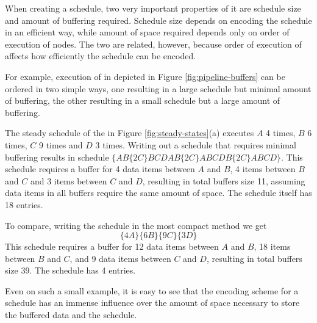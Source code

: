 \begin{comment}
\begin{figure}
\begin{center}

\psfig{figure=pipeline-buffers.eps,width=0.6in} \caption[4 {\filter}
{\pipeline}]{Sample 4 {\filter} {\pipeline}.  This {\pipeline} is
the same as one in Figure \ref{fig:steady-state} (a), except that
its children do not peek extra data} \label{fig:pipeline-buffers}
\end{center}
\end{figure}
\end{comment}

When creating a schedule, two very important properties of it are
schedule size and amount of buffering required.  Schedule size
depends on encoding the schedule in an efficient way, while amount
of space required depends only on order of execution of nodes. The
two are related, however, because order of execution of {\filters}
affects how efficiently the schedule can be encoded.

For example, execution of {\filters} in {\pipeline} depicted in Figure
\ref{fig:pipeline-buffers} can be ordered in two simple ways, one
resulting in a large schedule but minimal amount of buffering, the
other resulting in a small schedule but a large amount of
buffering.

The steady schedule of the {\pipeline} in Figure
\ref{fig:steady-states}(a) executes {\filter} $A$ 4 times,
{\filter} $B$ 6 times, {\filter} $C$ 9 times and {\filter} $D$ 3
times. Writing out a schedule that requires minimal buffering
results in schedule $\{AB\{2C\}BCDAB\{2C\}ABCDB\{2C\}ABCD\}$. This
schedule requires a buffer for 4 data items between {\filters} $A$
and $B$, 4 items between $B$ and $C$ and 3 items between $C$ and
$D$, resulting in total buffers size 11, assuming data items in
all buffers require the same amount of space. The schedule itself
has 18 entries.

To compare, writing the schedule in the most compact method we get
$$\{4A\}\{6B\}\{9C\}\{3D\}$$  This schedule requires a buffer for
12 data items between {\filters} $A$ and $B$, 18 items between $B$
and $C$, and 9 data items between $C$ and $D$, resulting in total
buffers size 39.  The schedule has 4 entries.

Even on such a small example, it is easy to see that the encoding
scheme for a schedule has an immense influence over the amount of
space necessary to store the buffered data and the schedule.

